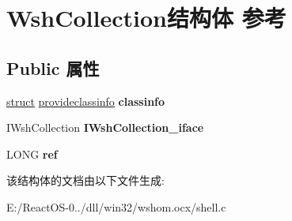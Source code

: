 \hypertarget{struct_wsh_collection}{}\section{Wsh\+Collection结构体 参考}
\label{struct_wsh_collection}
\subsection*{Public 属性}
\begin{DoxyCompactItemize}
\item 
\mbox{\label{struct_wsh_collection_a3d792d7946fbc0c0aed0b7aad2a9fdd7}} 
\hyperlink{interfacestruct}{struct} \hyperlink{structprovideclassinfo}{provideclassinfo} {\bfseries classinfo}
\item 
\mbox{\label{struct_wsh_collection_ac532b911bc4aa2f28273d2a0112acecb}} 
I\+Wsh\+Collection {\bfseries I\+Wsh\+Collection\+\_\+iface}
\item 
\mbox{\label{struct_wsh_collection_aacf52daabbb1c8494a804447704e43bd}} 
L\+O\+NG {\bfseries ref}
\end{DoxyCompactItemize}


该结构体的文档由以下文件生成\+:\begin{DoxyCompactItemize}
\item 
E\+:/\+React\+O\+S-\/0../dll/win32/wshom.\+ocx/shell.\+c\end{DoxyCompactItemize}

